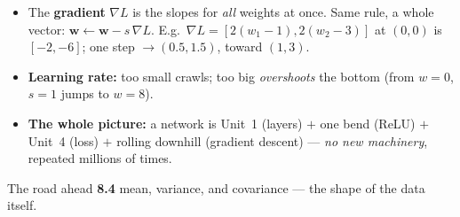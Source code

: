 \documentclass[aspectratio=169, 11pt]{beamer}
\newcommand{\ww}{\mathbf{w}}
\begin{document}
\begin{frame}[t, plain]
  \begin{itemize}
    \setlength{\itemsep}{6pt}
    \item The \textbf{gradient} $\nabla L$ is the slopes for \emph{all} weights at once. Same rule, a whole
          vector: $\ww \leftarrow \ww - s\,\nabla L$. \; E.g.\ $\nabla L=[2(w_1{-}1),2(w_2{-}3)]$ at $(0,0)$ is
          $[-2,-6]$; one step $\to(0.5,1.5)$, toward $(1,3)$.
    \item \textbf{Learning rate:} too small crawls; too big \emph{overshoots} the bottom (from $w=0$, $s=1$
          jumps to $w=8$).
    \item \textbf{The whole picture:} a network is Unit~1 (layers) $+$ one bend (ReLU) $+$ Unit~4 (loss) $+$
          rolling downhill (gradient descent) --- \emph{no new machinery}, repeated millions of times.
  \end{itemize}
  \vspace{2pt}
  \begin{block}{The road ahead}
    \textbf{8.4} mean, variance, and covariance --- the shape of the data itself.
  \end{block}
\end{frame}
\end{document}

